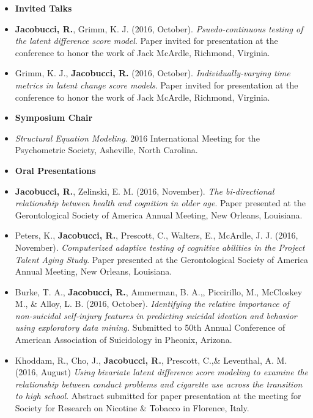 \documentclass[letterpaper,10pt]{article}
\newlength{\outerbordwidth}
\newcommand{\resheading}[1]{\vspace{8pt}
  \parbox{\textwidth}{\setlength{\FrameSep}{\outerbordwidth}
    \begin{shaded}
\setlength{\fboxsep}{0pt}\framebox[\textwidth][l]{\setlength{\fboxsep}{4pt}\fcolorbox{shadecolorB}{shadecolorB}{\textbf{\sffamily{\mbox{~}\makebox[6.762in][l]{\large #1} \vphantom{p\^{E}}}}}}
    \end{shaded}
  }\vspace{-5pt}
}
\begin{document}
\resheading{Presentations}
\begin{itemize} 
	\setlength{\topsep}{0pt}%
	\setlength{\leftmargin}{0.1in}%
	\setlength{\listparindent}{-0.1in}%
	\setlength{\itemindent}{-0.2in}%
	\setlength{\parsep}{\parskip}%
	
\item {\textbf{\large{Invited Talks}}}
	
\item[] \textbf{Jacobucci, R.}, Grimm, K. J. (2016, October). \emph{Psuedo-continuous testing of the latent difference score model}. Paper invited for presentation at the conference to honor the work of Jack McArdle, Richmond, Virginia.
%
\item[] Grimm, K. J., \textbf{Jacobucci, R.} (2016, October). \emph{ Individually-varying time metrics in latent change score models}. Paper invited for presentation at the conference to honor the work of Jack McArdle, Richmond, Virginia.
	
\item {\textbf{\large{Symposium Chair}}}

\item[] \emph{Structural Equation Modeling}. 2016 International Meeting for the Psychometric Society, Asheville, North Carolina.
	
%
\item {\textbf{\large{Oral Presentations}}}

\item[] \textbf{Jacobucci, R.}, Zelinski, E. M. (2016, November). \emph{The bi-directional relationship between health and cognition in older age}. Paper presented at the Gerontological Society of America Annual Meeting, New Orleans, Louisiana.

\item[] Peters, K., \textbf{Jacobucci, R.}, Prescott, C., Walters, E., McArdle, J. J. (2016, November). \emph{Computerized adaptive testing of cognitive abilities in the Project Talent Aging Study}. Paper presented at the Gerontological Society of America Annual Meeting, New Orleans, Louisiana.

\item[]Burke, T. A., \textbf{Jacobucci, R.}, Ammerman, B. A.,, Piccirillo, M., McCloskey M., \& Alloy, L. B. (2016, October). \textit{Identifying the relative importance of non-suicidal self-injury features in predicting suicidal ideation and behavior using exploratory data mining.} Submitted to 50th Annual Conference of American Association of Suicidology in Pheonix, Arizona.
%
\item[]Khoddam, R., Cho, J., \textbf{Jacobucci, R.}, Prescott, C.,\& Leventhal, A. M. (2016, August) \textit{Using bivariate latent difference score modeling to examine the relationship between conduct problems and cigarette use across the transition to high school}. Abstract submitted for paper presentation at the meeting for Society for Research on Nicotine \& Tobacco in Florence, Italy.


\end{itemize}
\end{document}
